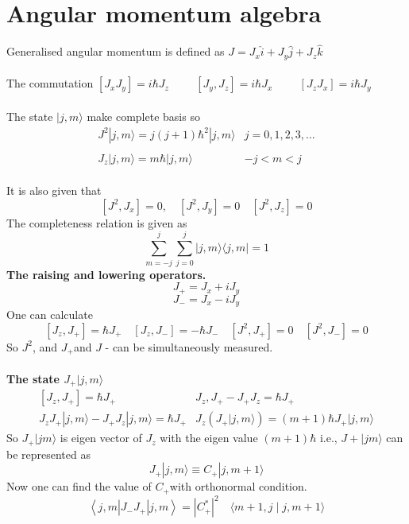 \section{Angular momentum algebra}
Generalised angular momentum is defined as $J=J_{x} \hat{i}+J_{y} \hat{j}+J_{z} \hat{k}$\\\\
 The commutation \hspace{1cm}$\left[J_{x} J_{y}\right]=i \hbar J_{z} \hspace{1cm} \left[J_{y}, J_{z}\right]=i \hbar J_{x}\hspace{1cm}\left[J_{z} J_{x}\right]=i \hbar J_{y}$\\\\
  The state $|j, m\rangle$ make complete basis so\\
  $$\begin{array}{lr}
  	J^{2}|j, m\rangle=j(j+1) \hbar^{2}|j, m\rangle & j=0,1,2,3, \ldots \\\\
  	J_{z}|j, m\rangle=m \hbar|j, m\rangle & -j<m<j
  \end{array}$$\\
  It is also given that $$\left[J^{2}, J_{x}\right]=0,\quad \left[J^{2}, J_{y}\right]=0 \quad\left[J^{2}, J_{z}\right]=0$$
  The completeness relation is given as $$\sum_{m=-j}^{j} \sum_{j=0}^{j}|j, m\rangle\langle j, m|=1$$
\textbf{The raising and lowering operators.}\\
$$
J_{+}=J_{x}+i J_{y}
$$
$$
J_{-}=J_{x}-i J_{y}
$$
One can calculate
$$
\left[J_{z}, J_{+}\right]=\hbar J_{+} \quad\left[J_{z}, J_{-}\right]=-\hbar J_{-} \quad\left[J^{2}, J_{+}\right]=0 \quad\left[J^{2}, J_{-}\right]=0
$$
So $J^{2}$, and $J_{+}$and $J$ - can be simultaneously measured.\\\\
\textbf{The state $J_{+}|j, m\rangle$}
$$
\begin{array}{ll}
{\left[J_{z}, J_{+}\right]=\hbar J_{+}} & J_{z}, J_{+}-J_{+} J_{z}=\hbar J_{+} \\
J_{z} J_{+}|j, m\rangle-J_{+} J_{z}|j, m\rangle=\hbar J_{+} & J_{z}\left(J_{+}|j, m\rangle\right)=(m+1) \hbar J_{+}|j, m\rangle
\end{array}
$$
So $J_{+}|j m\rangle$ is eigen vector of $J_{z}$ with the eigen value $(m+1) \hbar$ i.e., $J+|j m\rangle$ can be represented as $$J_{+}|j, m\rangle \equiv C_{+}|j, m+1\rangle$$
Now one can find the value of $C_{+}$with orthonormal condition.
$$
\left\langle j, m\left|J_{-} J_{+}\right| j, m\right\rangle=\left|C_{+}^{*}\right|^{2} \quad\langle m+1, j \mid j, m+1\rangle$$ 


